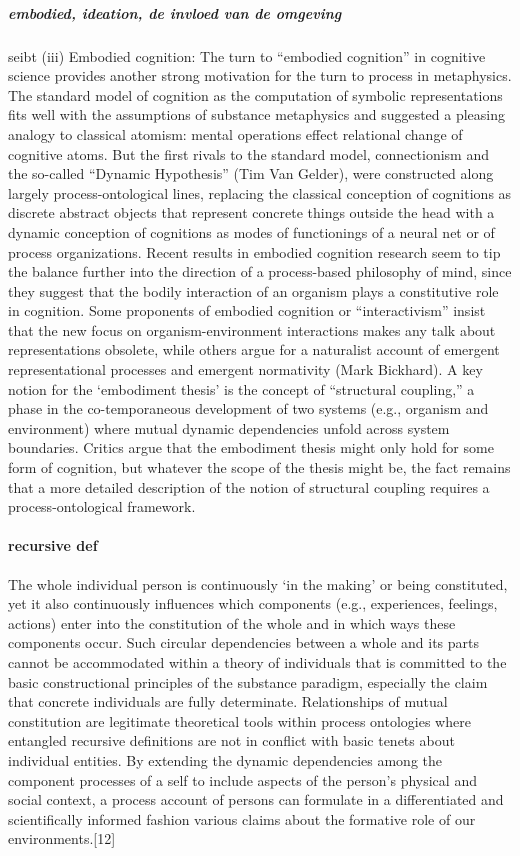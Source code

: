 {\subparagraph{embodied, ideation, de invloed van de omgeving}
seibt
(iii) Embodied cognition: The turn to “embodied cognition” in cognitive science provides another strong motivation for the turn to process in metaphysics. The standard model of cognition as the computation of symbolic representations fits well with the assumptions of substance metaphysics and suggested a pleasing analogy to classical atomism: mental operations effect relational change of cognitive atoms. But the first rivals to the standard model, connectionism and the so-called “Dynamic Hypothesis” (Tim Van Gelder), were constructed along largely process-ontological lines, replacing the classical conception of cognitions as discrete abstract objects that represent concrete things outside the head with a dynamic conception of cognitions as modes of functionings of a neural net or of process organizations. Recent results in embodied cognition research seem to tip the balance further into the direction of a process-based philosophy of mind, since they suggest that the bodily interaction of an organism plays a constitutive role in cognition. Some proponents of embodied cognition or “interactivism” insist that the new focus on organism-environment interactions makes any talk about representations obsolete, while others argue for a naturalist account of emergent representational processes and emergent normativity (Mark Bickhard). A key notion for the ‘embodiment thesis’ is the concept of “structural coupling,” a phase in the co-temporaneous development of two systems (e.g., organism and environment) where mutual dynamic dependencies unfold across system boundaries. Critics argue that the embodiment thesis might only hold for some form of cognition, but whatever the scope of the thesis might be, the fact remains that a more detailed description of the notion of structural coupling requires a process-ontological framework.

\paragraph{recursive def}
The whole individual person is continuously ‘in the making’ or being constituted, yet it also continuously influences which components (e.g., experiences, feelings, actions) enter into the constitution of the whole and in which ways these components occur. Such circular dependencies between a whole and its parts cannot be accommodated within a theory of individuals that is committed to the basic constructional principles of the substance paradigm, especially the claim that concrete individuals are fully determinate. Relationships of mutual constitution are legitimate theoretical tools within process ontologies where entangled recursive definitions are not in conflict with basic tenets about individual entities. By extending the dynamic dependencies among the component processes of a self to include aspects of the person's physical and social context, a process account of persons can formulate in a differentiated and scientifically informed fashion various claims about the formative role of our environments.[12]


}
